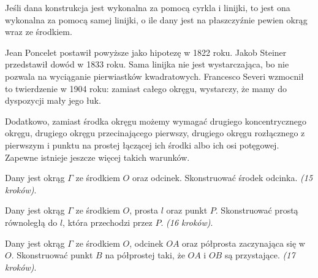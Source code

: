 \begin{theorem}
    Jeśli dana konstrukcja jest wykonalna za pomocą cyrkla i linijki, to jest ona wykonalna za pomocą samej linijki, o ile dany jest na płaszczyźnie pewien okrąg wraz ze środkiem.
\end{theorem}

Jean Poncelet postawił powyższe jako hipotezę w 1822 roku.
%
Jakob Steiner przedstawił dowód w 1833 roku.
Sama linijka nie jest wystarczająca, bo nie pozwala na wyciąganie pierwiastków kwadratowych.
Francesco Severi wzmocnił to twierdzenie w 1904 roku: zamiast całego okręgu, wystarczy, że mamy do dyspozycji mały jego łuk.

Dodatkowo, zamiast środka okręgu możemy wymagać drugiego koncentrycznego okręgu, drugiego okręgu przecinającego pierwszy, drugiego okręgu rozłącznego z pierwszym i punktu na prostej łączącej ich środki albo ich osi potęgowej.
Zapewne istnieje jeszcze więcej takich warunków.

\begin{problem}
    Dany jest okrąg $\Gamma$ ze środkiem $O$ oraz odcinek.
    Skonstruować środek odcinka. \hfill \emph{(15 kroków)}. %
\end{problem}

\begin{problem}
    Dany jest okrąg $\Gamma$ ze środkiem $O$, prosta $l$ oraz punkt $P$.
    Skonstruować prostą równoległą do $l$, która przechodzi przez $P$. \hfill \emph{(16 kroków)}. %
\end{problem}

\begin{problem}
    Dany jest okrąg $\Gamma$ ze środkiem $O$, odcinek $OA$ oraz półprosta zaczynająca się w $O$.
    Skonstruować punkt $B$ na półprostej taki, że $OA$ i $OB$ są przystające. \hfill \emph{(17 kroków)}. %
\end{problem}

